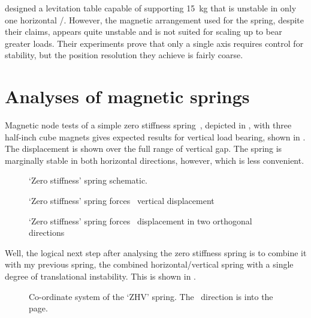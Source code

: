 \documentclass[11pt,a4paper]{memoir}
\begin{document}
\textcite{choi2003} designed a levitation table capable of supporting \SI{15}{kg} that is unstable in only one horizontal \dof/.
However, the magnetic arrangement used for the spring, despite their claims, appears quite unstable and is not suited for scaling up to bear greater loads.
Their experiments prove that only a single axis requires control for stability, but the position resolution they achieve is fairly coarse.

\section{Analyses of magnetic springs}

Magnetic node tests of a simple zero stiffness
spring~\cite{nijsse2001}, depicted in
, with three half-inch cube magnets
gives expected results for vertical load bearing, shown in
. The displacement is shown over the full
range of vertical gap. The spring is marginally stable in both
horizontal directions, however, which is less convenient.
\begin{figure}
  \centering
  \caption{`Zero stiffness' spring schematic.}
\end{figure}

\begin{figure}
  \centering
  \caption{`Zero stiffness' spring forces \vs\ vertical displacement}
\end{figure}

\begin{figure}
  \centering
  \caption{`Zero stiffness' spring forces \vs\ displacement in two orthogonal directions}
\end{figure}



Well, the logical next step after analysing the zero stiffness spring
is to combine it with my previous spring, the combined
horizontal/vertical spring with a single degree of translational
instability. This is shown in .

\begin{figure}
   \centering
   \caption{Co-ordinate system of the `ZHV' spring. The \y\ direction is into the page.}
\end{figure}
\end{document}
